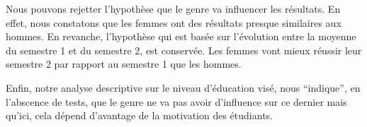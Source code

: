 \documentclass[
  11pt,
  french,
]{article}
\begin{document}
Nous pouvons rejetter l'hypothèse que le genre va influencer les
résultats. En effet, nous constatons que les femmes ont des résultats
presque similaires aux hommes. En revanche, l'hypothèse qui est basée
sur l'évolution entre la moyenne du semestre 1 et du semestre 2, est
conservée. Les femmes vont mieux réussir leur semestre 2 par rapport au
semestre 1 que les hommes.

Enfin, notre analyse descriptive sur le niveau d'éducation visé, nous
``indique'', en l'abscence de tests, que le genre ne va pas avoir
d'influence sur ce dernier mais qu'ici, cela dépend d'avantage de la
motivation des étudiants.
\end{document}
